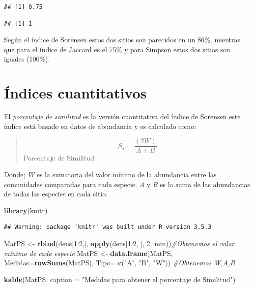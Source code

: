\documentclass[]{book}
\newenvironment{Shaded}{\begin{snugshade}}{\end{snugshade}}
\newcommand{\KeywordTok}[1]{\textcolor[rgb]{0.13,0.29,0.53}{\textbf{{#1}}}}
\newcommand{\DataTypeTok}[1]{\textcolor[rgb]{0.13,0.29,0.53}{{#1}}}
\newcommand{\DecValTok}[1]{\textcolor[rgb]{0.00,0.00,0.81}{{#1}}}
\newcommand{\StringTok}[1]{\textcolor[rgb]{0.31,0.60,0.02}{{#1}}}
\newcommand{\CommentTok}[1]{\textcolor[rgb]{0.56,0.35,0.01}{\textit{{#1}}}}
\newcommand{\NormalTok}[1]{{#1}}
\begin{document}
\begin{verbatim}
## [1] 0.75
\end{verbatim}

\begin{verbatim}
## [1] 1
\end{verbatim}

Según el índice de Sorensen estos dos sitios son parecidos en un 86\%,
mientras que para el índice de Jaccard es el 75\% y para Simpson estos
dos sitios son iguales (100\%).

\section{Índices cuantitativos}\label{indices-cuantitativos}

El \emph{porcentaje de similitud} es la versión cuantitativa del índice
de Sorensen este índice está basado en datos de abundancia y es
calculado como:

\begin{quote}
\[S_s= \frac{(2W)}{A+B}\] Porcentaje de Similitud
\end{quote}

Donde; \emph{W} es la sumatoria del valor mínimo de la abundancia entre
las comunidades comparadas para cada especie. \emph{A} y \emph{B} es la
suma de las abundancias de todas las especies en cada sitio.

\begin{Shaded}
\begin{Highlighting}[]
\KeywordTok{library}\NormalTok{(knitr)}
\end{Highlighting}
\end{Shaded}

\begin{verbatim}
## Warning: package 'knitr' was built under R version 3.5.3
\end{verbatim}

\begin{Shaded}
\begin{Highlighting}[]
\NormalTok{MatPS <-}\StringTok{ }\KeywordTok{rbind}\NormalTok{(dens[}\DecValTok{1}\NormalTok{:}\DecValTok{2}\NormalTok{,], }\KeywordTok{apply}\NormalTok{(dens[}\DecValTok{1}\NormalTok{:}\DecValTok{2}\NormalTok{, ], }\DecValTok{2}\NormalTok{, min))}\CommentTok{#Obtenemos el valor mínimo de cada especie}
\NormalTok{MatPS <-}\StringTok{ }\KeywordTok{data.frame}\NormalTok{(MatPS, }\DataTypeTok{Medidas=}\KeywordTok{rowSums}\NormalTok{(MatPS), }\DataTypeTok{Tipo=} \KeywordTok{c}\NormalTok{(}\StringTok{"A"}\NormalTok{, }\StringTok{"B"}\NormalTok{, }\StringTok{"W"}\NormalTok{)) }\CommentTok{#Obtenemos W,A,B}

\KeywordTok{kable}\NormalTok{(MatPS, }\DataTypeTok{caption =} \StringTok{"Medidas para obtener el porcentaje de Similitud"}\NormalTok{)}
\end{Highlighting}
\end{Shaded}
\end{document}
